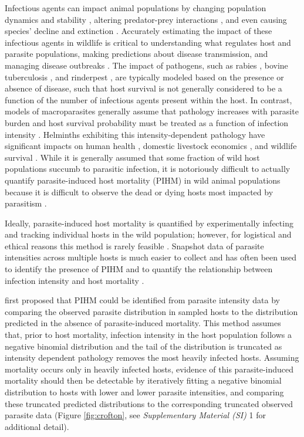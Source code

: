 \documentclass[12pt, a4paper]{article}
\begin{document}
Infectious agents can impact animal populations by changing
population dynamics and stability \citep{Dobson1992,Tompkins2002}, altering predator-prey interactions \citep{Joly2004}, and
even causing species' decline and extinction \citep{DeCastro2005a,McCallum2012b}. Accurately estimating the impact
of these infectious agents in wildlife is critical to understanding what
regulates host and parasite populations, making predictions about disease
transmission, and managing disease outbreaks \citep{Langwig2015}. The impact of pathogens, such as rabies \citep{Coyne1989}, bovine tuberculosis \citep{Cox2005}, and
rinderpest \citep{Tille1991}, are typically modeled based on the presence or absence of disease, such that host survival is not generally considered to be a function of the number of infectious agents present within the host.  In contrast, models of macroparasites generally assume that pathology increases with parasite burden and host survival probability must be treated as a function of infection intensity \citep{AndersonandMay1978}. Helminths exhibiting this intensity-dependent pathology have significant impacts on human health \citep{Brooker2004}, domestic livestock economics \citep{Roeber2013}, and wildlife survival \citep{Kirk2003,Logiudice2003}. While it is generally assumed that some fraction of wild host populations succumb to parasitic infection, it is notoriously difficult to actually quantify parasite-induced host mortality (PIHM) in wild animal populations because it is difficult to observe the dead or dying hosts most impacted by parasitism \citep{McCallum2000a}.

Ideally, parasite-induced host mortality is
quantified by experimentally infecting and tracking individual hosts in the
wild population; however, for logistical and ethical reasons this method is
rarely feasible \citep{McCallum2000a}. Snapshot data of parasite intensities across multiple hosts is much easier to collect and has
often been used to identify the presence of PIHM \citep{Crofton1971a,Lester1977,Lester1984,Lanciani1989,Royce1990,Ferguson2011} and to quantify the
relationship between infection intensity and host mortality \citep{Adjei1986}.

\cite{Crofton1971a} first proposed that PIHM could be identified from parasite intensity data by comparing the
observed parasite distribution in sampled hosts to the distribution
predicted in the absence of parasite-induced mortality. This method
assumes that, prior to host mortality, infection intensity in the host population follows a negative binomial distribution and the tail of the distribution is truncated as intensity dependent pathology removes the most heavily infected hosts. Assuming mortality occurs only in heavily infected hosts, evidence of this parasite-induced mortality should then be detectable by iteratively
fitting a negative binomial distribution to hosts with lower and lower parasite intensities, and comparing these truncated predicted distributions to the corresponding truncated observed parasite data (Figure \ref{fig:crofton}, see \emph{Supplementary Material (SI)} 1 for additional detail).
\end{document}
